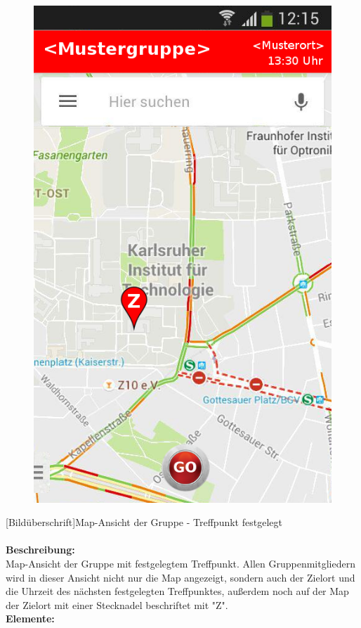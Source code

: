 \begin{figure}
	\includegraphics[scale =1]{resources/images/map.png}
\end{figure}
[Bildüberschrift]Map-Ansicht der Gruppe - Treffpunkt festgelegt\\ \\
\textbf{Beschreibung:}\\
Map-Ansicht der Gruppe mit festgelegtem Treffpunkt. Allen Gruppenmitgliedern wird in dieser Ansicht nicht nur die Map angezeigt, sondern auch der Zielort und die Uhrzeit des nächsten festgelegten Treffpunktes, außerdem noch auf der Map der Zielort mit einer Stecknadel beschriftet mit "Z".\\
\textbf{Elemente:}\\
